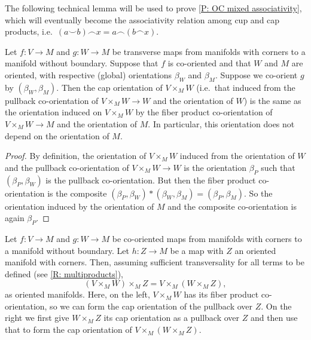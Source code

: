 The following technical lemma will be used to prove \cref{P: OC mixed associativity}, which will eventually become the associativity relation among cup and cap products, i.e.\ $(a \smile b) \frown x = a \frown (b \frown x)$.

\begin{lemma}\label{L: same induced}
	Let $f \colon V \to M$ and $g \colon W \to M$ be transverse maps from manifolds with corners to a manifold without boundary.
	Suppose that $f$ is co-oriented and that $W$ and $M$ are oriented, with respective (global) orientations $\beta_W$ and $\beta_M$.
	Suppose we co-orient $g$ by $(\beta_W,\beta_M)$.
	Then the cap orientation of $V \times_M W$ (i.e.\ that induced from the pullback co-orientation of $V \times_M W \to W$ and the orientation of $W$) is the same as the orientation induced on $V \times_M W$ by the fiber product co-orientation of $V \times_M W \to M$ and the orientation of $M$.
	In particular, this orientation does not depend on the orientation of $M$.
\end{lemma}

\begin{proof}
	By definition, the orientation of $V \times_M W$ induced from the orientation of $W$ and the pullback co-orientation of $V \times_M W \to W$ is the orientation $\beta_P$ such that $(\beta_P,\beta_W)$ is the pullback co-orientation.
	But then the fiber product co-orientation is the composite $(\beta_P,\beta_W)*(\beta_W,\beta_M) = (\beta_P,\beta_M)$.
	So the orientation induced by the orientation of $M$ and the composite co-orientation is again $\beta_P$.
\end{proof}

\begin{proposition}\label{P: OC mixed associativity}
	Let $f \colon V \to M$ and $g \colon W \to M$ be co-oriented maps from manifolds with corners to a manifold without boundary.
	Let $h \colon Z \to M$ be a map with $Z$ an oriented manifold with corners.
	Then, assuming sufficient transversality for all terms to be defined (see \cref{R: multiproducts}),
	$$(V \times_M W) \times_M Z = V \times_M (W \times_M Z),$$
	as oriented manifolds.
	Here, on the left, $V \times_M W$ has its fiber product co-orientation, so we can form the cap orientation of the pullback over $Z$.
	On the right we first give $W \times_M Z$ its cap orientation as a pullback over $Z$ and then use that to form the cap orientation of $V \times_M (W \times_M Z)$.
\end{proposition}


